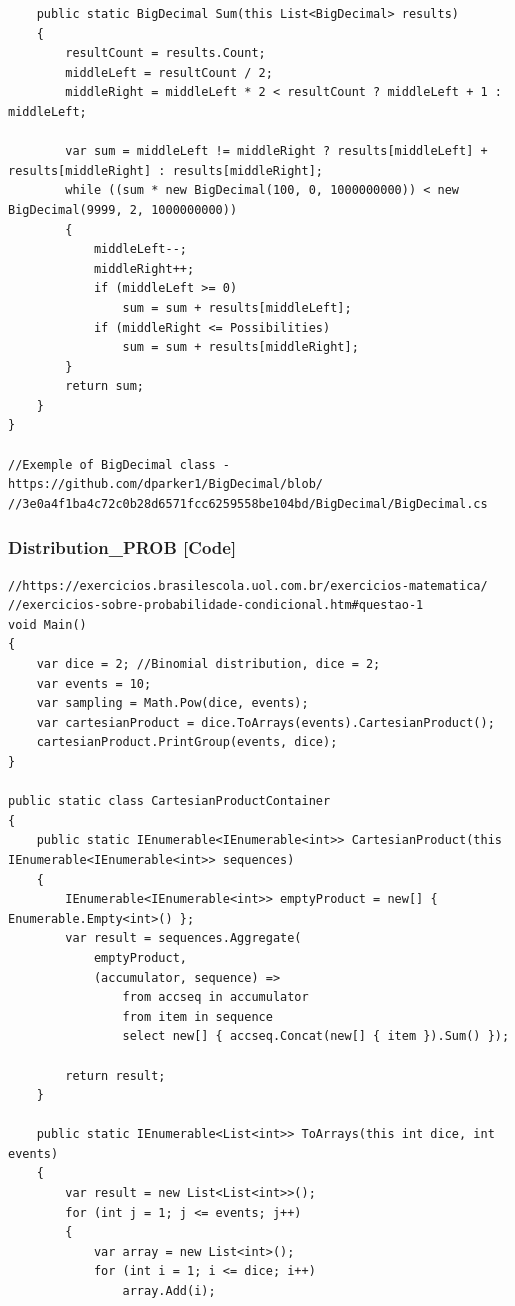 \begin{apendicesenv}
\begin{lstlisting}
    public static BigDecimal Sum(this List<BigDecimal> results)
    {
        resultCount = results.Count;
        middleLeft = resultCount / 2;
        middleRight = middleLeft * 2 < resultCount ? middleLeft + 1 : middleLeft;

        var sum = middleLeft != middleRight ? results[middleLeft] + results[middleRight] : results[middleRight];
        while ((sum * new BigDecimal(100, 0, 1000000000)) < new BigDecimal(9999, 2, 1000000000))
        {
            middleLeft--;
            middleRight++;
            if (middleLeft >= 0)
                sum = sum + results[middleLeft];
            if (middleRight <= Possibilities)
                sum = sum + results[middleRight];
        }
        return sum;
    }
}

//Exemple of BigDecimal class - https://github.com/dparker1/BigDecimal/blob/
//3e0a4f1ba4c72c0b28d6571fcc6259558be104bd/BigDecimal/BigDecimal.cs
\end{lstlisting}

\bigbreak
\bigbreak
\subsubsection*{Distribution\_PROB [Code]}
\begin{lstlisting}
//https://exercicios.brasilescola.uol.com.br/exercicios-matematica/
//exercicios-sobre-probabilidade-condicional.htm#questao-1
void Main()
{
    var dice = 2; //Binomial distribution, dice = 2;
    var events = 10;
    var sampling = Math.Pow(dice, events);
    var cartesianProduct = dice.ToArrays(events).CartesianProduct();
    cartesianProduct.PrintGroup(events, dice);
}

public static class CartesianProductContainer
{
    public static IEnumerable<IEnumerable<int>> CartesianProduct(this IEnumerable<IEnumerable<int>> sequences)
    {
        IEnumerable<IEnumerable<int>> emptyProduct = new[] { Enumerable.Empty<int>() };
        var result = sequences.Aggregate(
            emptyProduct,
            (accumulator, sequence) =>
                from accseq in accumulator
                from item in sequence
                select new[] { accseq.Concat(new[] { item }).Sum() });

        return result;
    }

    public static IEnumerable<List<int>> ToArrays(this int dice, int events)
    {
        var result = new List<List<int>>();
        for (int j = 1; j <= events; j++)
        {
            var array = new List<int>();
            for (int i = 1; i <= dice; i++)
                array.Add(i);
            

\end{lstlisting}
\end{apendicesenv}

